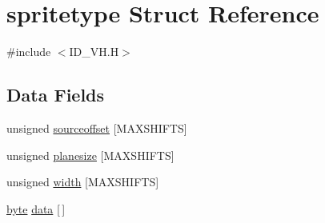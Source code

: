 \hypertarget{structspritetype}{
\section{spritetype Struct Reference}
\label{structspritetype}
}


{\ttfamily \#include $<$ID\_\-VH.H$>$}

\subsection*{Data Fields}
\begin{DoxyCompactItemize}
\item 
unsigned \hyperlink{structspritetype_a646d4271d08201079e11fe62c35cf158}{sourceoffset} \mbox{[}MAXSHIFTS\mbox{]}
\item 
unsigned \hyperlink{structspritetype_a48a9eb892781841315b57b3911521930}{planesize} \mbox{[}MAXSHIFTS\mbox{]}
\item 
unsigned \hyperlink{structspritetype_a8f40c2748554d1ad92989a462f9dd89c}{width} \mbox{[}MAXSHIFTS\mbox{]}
\item 
\hyperlink{ID__HEAD_8H_a0c8186d9b9b7880309c27230bbb5e69d}{byte} \hyperlink{structspritetype_a679b747ceb4db46a0f3928e176e2bb50}{data} \mbox{[}$\,$\mbox{]}
\end{DoxyCompactItemize}


